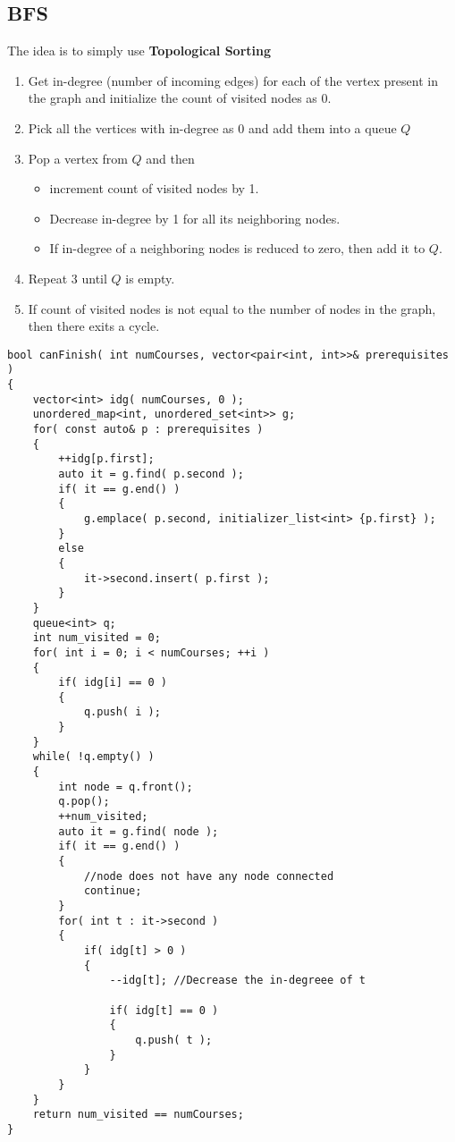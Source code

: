 \subsection{BFS}
The idea is to simply use \textbf{Topological Sorting}
\begin{enumerate}
    \item Get in-degree (number of incoming edges) for each of the vertex present in the graph and initialize the count of visited nodes as 0.
    \item Pick all the vertices with in-degree as 0 and add them into a queue $Q$
    \item Pop a vertex from $Q$ and then
    \begin{itemize}
        \item increment count of visited nodes by 1. 
        \item Decrease in-degree by 1 for all its neighboring nodes.
    \item If in-degree of a neighboring nodes is reduced to zero, then add it to $Q$.
\end{itemize}
\item Repeat 3 until $Q$ is empty.
\item If count of visited nodes is not equal to the number of nodes in the graph, then there exits a cycle.
\end{enumerate}

\begin{lstlisting}[style=customc, caption={BFS}]
bool canFinish( int numCourses, vector<pair<int, int>>& prerequisites )
{
    vector<int> idg( numCourses, 0 );
    unordered_map<int, unordered_set<int>> g;
    for( const auto& p : prerequisites )
    {
        ++idg[p.first];
        auto it = g.find( p.second );
        if( it == g.end() )
        {
            g.emplace( p.second, initializer_list<int> {p.first} );
        }
        else
        {
            it->second.insert( p.first );
        }
    }
    queue<int> q;
    int num_visited = 0;
    for( int i = 0; i < numCourses; ++i )
    {
        if( idg[i] == 0 )
        {
            q.push( i );
        }
    }
    while( !q.empty() )
    {
        int node = q.front();
        q.pop();
        ++num_visited;
        auto it = g.find( node );
        if( it == g.end() )
        {
            //node does not have any node connected
            continue;
        }
        for( int t : it->second )
        {
            if( idg[t] > 0 )
            {
                --idg[t]; //Decrease the in-degreee of t

                if( idg[t] == 0 )
                {
                    q.push( t );
                }
            }
        }
    }
    return num_visited == numCourses;
}
\end{lstlisting}